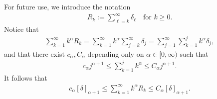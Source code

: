 \documentclass[reqno,12pt]{amsart} %
\theoremstyle{definition}
\theoremstyle{remark}
\newtheorem{remark}[theorem]{Remark}
\numberwithin{equation}{section}
\begin{document}

For future use, we introduce the notation 
\begin{align}
  \label{conver_def_Rk}
  R_k:=\sum_{\ell=k}^\infty \delta_\ell\quad\text{for }k\geq 0.
\end{align}
Notice  that
\begin{align*}
  \sum_{k=1}^\infty k^\alpha R_k=\sum_{k=1}^\infty k^\alpha \sum_{j=k}^\infty \delta_j=\sum_{j=1}^\infty \sum_{k=1}^j k^\alpha \delta_j,
\end{align*}
and that there exist $c_\alpha, C_\alpha$ depending only on $\alpha\in [0,\infty)$ such that
\begin{align*}
  c_\alpha j^{\alpha+1}\leq \sum_{k=1}^j k^\alpha\leq C_\alpha j^{\alpha+1}.
\end{align*}
It follows that 
\begin{align}\label{recursive_es_Rk}
  c_\alpha [\delta]_{\alpha+1}\leq \sum_{k=1}^\infty k^\alpha R_k\leq C_\alpha [\delta]_{\alpha+1}.
\end{align}
\end{document}
